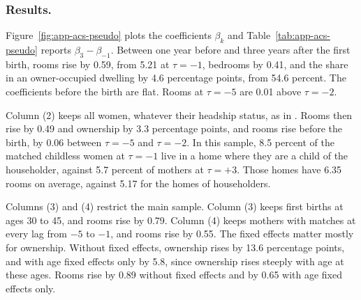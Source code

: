 \subsubsection*{Results.}
Figure~\ref{fig:app-acs-pseudo} plots the coefficients $\beta_k$ and
Table~\ref{tab:app-acs-pseudo} reports $\beta_3 - \beta_{-1}$. Between one
year before and three years after the first birth, rooms rise by 0.59, from
5.21 at $\tau=-1$, bedrooms by 0.41, and the share in an owner-occupied
dwelling by 4.6 percentage points, from 54.6 percent. The coefficients before
the birth are flat. Rooms at $\tau=-5$ are 0.01 above $\tau=-2$.

Column (2) keeps all women, whatever their headship status, as in
\citet{klevenGeographyChildPenalties2025}. Rooms then rise by 0.49 and
ownership by 3.3 percentage points, and rooms rise before the birth, by 0.06
between $\tau=-5$ and $\tau=-2$. In this sample, 8.5 percent of the matched
childless women at $\tau=-1$ live in a home where they are a child of the
householder, against 5.7 percent of mothers at $\tau=+3$. Those homes have
6.35 rooms on average, against 5.17 for the homes of householders.

Columns (3) and (4) restrict the main sample. Column (3) keeps first births
at ages 30 to 45, and rooms rise by 0.79. Column (4) keeps mothers with
matches at every lag from $-5$ to $-1$, and rooms rise by 0.55. The fixed
effects matter mostly for ownership. Without fixed effects, ownership rises by
13.6 percentage points, and with age fixed effects only by 5.8, since
ownership rises steeply with age at these ages. Rooms rise by 0.89 without
fixed effects and by 0.65 with age fixed effects only.

